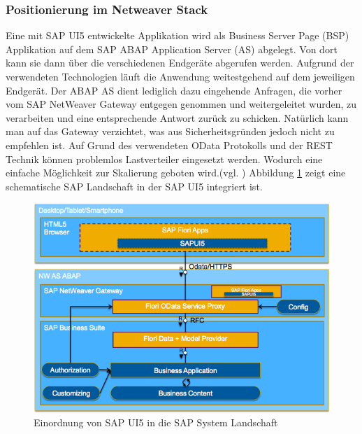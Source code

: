 \subsubsection{Positionierung im Netweaver Stack}
Eine mit SAP UI5 entwickelte Applikation wird als Business Server Page (BSP) Applikation auf dem SAP ABAP Application Server (AS) abgelegt. Von dort kann sie dann über die verschiedenen Endgeräte abgerufen werden. Aufgrund der verwendeten Technologien läuft die Anwendung weitestgehend auf dem jeweiligen Endgerät. Der ABAP AS dient lediglich dazu eingehende Anfragen, die vorher vom SAP NetWeaver Gateway entgegen genommen und weitergeleitet wurden, zu verarbeiten und eine entsprechende Antwort zurück zu schicken. Natürlich kann man auf das Gateway verzichtet, was aus Sicherheitsgründen jedoch nicht zu empfehlen ist. Auf Grund des verwendeten OData Protokolls und der REST Technik können problemlos Lastverteiler eingesetzt werden. Wodurch eine einfache Möglichkeit zur Skalierung geboten wird.(vgl. \cite{SAPFIORIARCH}) Abbildung \ref{fig:sapui5arch} zeigt eine schematische SAP Landschaft in der SAP UI5 integriert ist.

\vspace{1em}
\begin{figure}[htb]
  \centering
  \includegraphics[width=0.8\linewidth]{abb/sap_ui5_architecture}
  \caption[Einordnung von SAP UI5 in die SAP System Landschaft]{Einordnung von SAP UI5 in die SAP System Landschaft \cite{SAPFIORIARCH}}
  \label{fig:sapui5arch}
\end{figure}